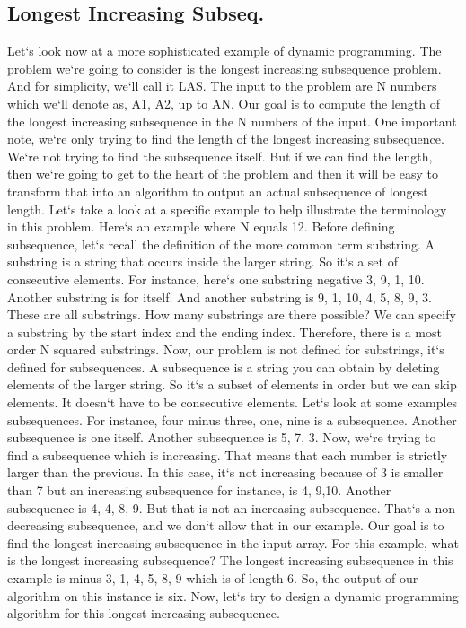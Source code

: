 \subsection{Longest Increasing Subseq.}
Let`s look now at a more sophisticated example of dynamic programming.
The problem we`re going to consider is the longest increasing subsequence problem.
And for simplicity, we`ll call it LAS\@.
The input to the problem are N numbers which we`ll denote as, A1, A2, up to AN\@.
Our goal is to compute the length of the longest increasing subsequence in the N numbers of the input.
One important note, we`re only trying to find the length of the longest increasing subsequence.
We`re not trying to find the subsequence itself.
But if we can find the length, then we`re going to get to the heart of the problem and then it will be easy to transform that into an algorithm to output an actual subsequence of longest length.
Let`s take a look at a specific example to help illustrate the terminology in this problem.
Here`s an example where N equals 12.
Before defining subsequence, let`s recall the definition of the more common term substring.
A substring is a string that occurs inside the larger string.
So it`s a set of consecutive elements.
For instance, here`s one substring negative 3, 9, 1, 10.
Another substring is for itself.
And another substring is 9, 1, 10, 4, 5, 8, 9, 3.
These are all substrings.
How many substrings are there possible? We can specify a substring by the start index and the ending index.
Therefore, there is a most order N squared substrings.
Now, our problem is not defined for substrings, it`s defined for subsequences.
A subsequence is a string you can obtain by deleting elements of the larger string.
So it`s a subset of elements in order but we can skip elements.
It doesn`t have to be consecutive elements.
Let`s look at some examples subsequences.
For instance, four minus three, one, nine is a subsequence.
Another subsequence is one itself.
Another subsequence is 5, 7, 3.
Now, we`re trying to find a subsequence which is increasing.
That means that each number is strictly larger than the previous.
In this case, it`s not increasing because of 3 is smaller than 7 but an increasing subsequence for instance, is 4, 9,10.
Another subsequence is 4, 4, 8, 9.
But that is not an increasing subsequence.
That`s a non-decreasing subsequence, and we don`t allow that in our example.
Our goal is to find the longest increasing subsequence in the input array.
For this example, what is the longest increasing subsequence? The longest increasing subsequence in this example is minus 3, 1, 4, 5, 8, 9 which is of length 6.
So, the output of our algorithm on this instance is six.
Now, let`s try to design a dynamic programming algorithm for this longest increasing subsequence.

